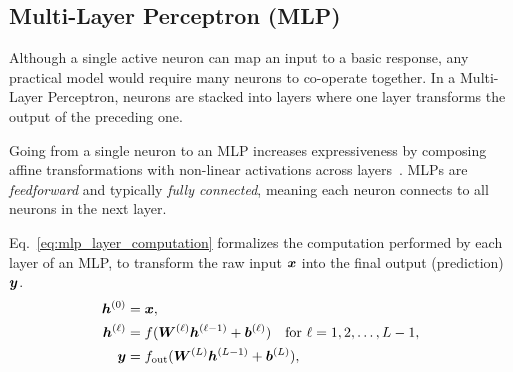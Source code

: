 
\subsection{Multi-Layer Perceptron (MLP)}

Although a single active neuron can map an input to a basic response, any practical model would require many neurons to co-operate together. In a Multi-Layer Perceptron, neurons are stacked into layers where one layer transforms the output of the preceding one.

Going from a single neuron to an MLP increases expressiveness by composing affine transformations with non-linear activations across layers~\cite{Rumelhart1986}. MLPs are \emph{feedforward} and typically \emph{fully connected}, meaning each neuron connects to all neurons in the next layer.

Eq.~\eqref{eq:mlp_layer_computation} formalizes the computation performed by each layer of an MLP, to transform the raw input $\bm{x}$ into the final output (prediction)$\bm{y}$.
\begin{equation}
\label{eq:mlp_layer_computation}
\begin{aligned}
	\bm{h}^{(0)} &= \bm{x},\\
	\bm{h}^{(\ell)} &= f(\bm{W}^{(\ell)}\bm{h}^{(\ell-1)} + \bm{b}^{(\ell)}) \quad \text{for } \ell = 1, 2, \ldots, L-1,\\
	\bm{y} &= f_{\text{out}}(\bm{W}^{(L)}\bm{h}^{(L-1)} + \bm{b}^{(L)}),
\end{aligned}
\end{equation}

